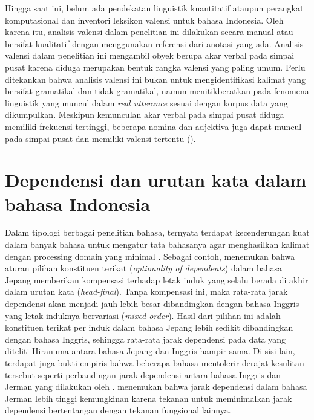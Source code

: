 Hingga saat ini, belum ada pendekatan linguistik kuantitatif ataupun perangkat komputasional dan inventori leksikon valensi untuk bahasa Indonesia. Oleh karena itu, analisis valensi dalam penelitian ini dilakukan secara manual atau bersifat kualitatif dengan menggunakan referensi dari anotasi yang ada. Analisis valensi dalam penelitian ini mengambil obyek berupa akar verbal pada simpai pusat karena diduga merupakan bentuk rangka valensi yang paling umum. Perlu ditekankan bahwa analisis valensi ini bukan untuk mengidentifikasi kalimat yang bersifat gramatikal dan tidak gramatikal, namun menitikberatkan pada fenomena linguistik yang muncul dalam \textit{real utterance} sesuai dengan korpus data yang dikumpulkan. Meskipun kemunculan akar verbal pada simpai pusat diduga memiliki frekuensi tertinggi, beberapa nomina dan adjektiva juga dapat muncul pada simpai pusat dan memiliki valensi tertentu (\citealp{vreznivckova2003czech, hajic2003pdt}).

\section{Dependensi dan urutan kata dalam bahasa Indonesia}
Dalam tipologi berbagai penelitian bahasa, ternyata terdapat kecenderungan kuat dalam banyak bahasa untuk mengatur tata bahasanya agar menghasilkan kalimat dengan processing domain yang minimal \citep{hawkins2001second}. Sebagai contoh, \cite{hiranuma1999syntactic} menemukan bahwa aturan pilihan konstituen terikat (\textit{optionality of dependents}) dalam bahasa Jepang memberikan kompensasi terhadap letak induk yang selalu berada di akhir dalam urutan kata (\textit{head-final}). Tanpa kompensasi ini, maka rata-rata jarak dependensi akan menjadi jauh lebih besar dibandingkan dengan bahasa Inggris yang letak induknya bervariasi (\textit{mixed-order}). Hasil dari pilihan ini adalah konstituen terikat per induk dalam bahasa Jepang lebih sedikit dibandingkan dengan bahasa Inggris, sehingga rata-rata jarak dependensi pada data yang diteliti Hiranuma antara bahasa Jepang dan Inggris hampir sama. Di sisi lain, terdapat juga bukti empiris bahwa beberapa bahasa mentolerir derajat kesulitan tersebut seperti perbandingan jarak dependensi antara bahasa Inggris dan Jerman yang dilakukan oleh \cite{eppler2005syntax}. \cite{eppler2005syntax} menemukan bahwa jarak dependensi dalam bahasa Jerman lebih tinggi kemungkinan karena tekanan untuk meminimalkan jarak dependensi bertentangan dengan tekanan fungsional lainnya.

